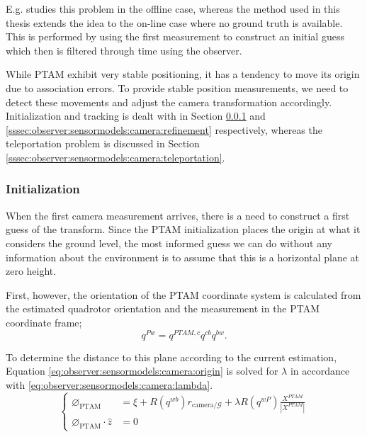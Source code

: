     E.g. \citep{hayashi2010} studies this problem in the offline case,
    whereas the method used in this thesis extends the idea to the on-line
    case where no ground truth is available. This is performed by using the
    first measurement to construct an initial guess which then is filtered
    through time using the observer.

    While PTAM exhibit very stable positioning, it has a tendency to move
    its origin due to association errors. To provide stable position
    measurements, we need to detect these movements and adjust the
    camera transformation accordingly. Initialization and tracking is dealt with in
    Section \ref{sssec:observer:sensormodels:camera:initialization} and \ref{sssec:observer:sensormodels:camera:refinement}
    respectively, whereas the teleportation problem is discussed in
    Section \ref{sssec:observer:sensormodels:camera:teleportation}.

    \subsubsection{Initialization}
        \label{sssec:observer:sensormodels:camera:initialization}
        When the first camera measurement arrives, there is a need to construct a
        first guess of the transform. Since the PTAM initialization places
        the origin at what it considers the ground level, the most informed
        guess we can do without any information about the environment is
        to assume that this is a horizontal plane at zero height.

        First, however, the orientation of the PTAM coordinate system is calculated
        from the estimated quadrotor orientation and the measurement in the
        PTAM coordinate frame;
        \begin{equation}
            \label{eq:observer:sensormodels:camera:qpw}
            q^{Pw} = q^{PTAM,c} q^{cb} q^{bw}.
        \end{equation}

        To determine the distance to this plane according to the current estimation,
        Equation \eqref{eq:observer:sensormodels:camera:origin} is solved for $\lambda$
        in accordance with \ref{eq:observer:sensormodels:camera:lambda}.
        \begin{equation}
            \label{eq:observer:sensormodels:camera:origin}
            \left\lbrace
            \begin{array}{ll}
                \varnothing_{\text{PTAM}} &= \xi + R(q^{wb}) r_{\text{camera}/\mathcal{G}} + \lambda R(q^{wP}) \frac{X^{PTAM}}{|X^{PTAM}|} \\
                \varnothing_{\text{PTAM}} \cdot \hat{z} &= 0
            \end{array}\right.
        \end{equation}

